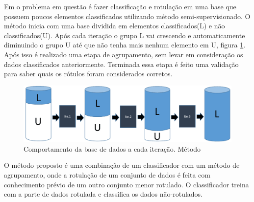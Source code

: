 Em \cite{Metodo2015} o problema em questão é fazer classificação e rotulação em uma base que possuem poucos elementos classificados utilizando método semi-supervisionado. O método inicia com uma base dividida em elementos classificados(L) e não classificados(U). Após cada iteração o grupo L vai crescendo e automaticamente diminuindo o grupo U até que não tenha mais nenhum elemento em U, figura  \ref{fig:modeloVicente}. Após isso é realizado uma etapa de agrupamento, sem levar em consideração os dados classificados anteriormente. Terminada essa etapa é feito uma validação para saber quais os rótulos foram considerados corretos.
\begin{figure}[!h]
        \centering
        \includegraphics[scale=0.4]{figs/modeloVicente.png}
        \caption{Comportamento da base de dados a cada iteração. Método \cite{Metodo2015}} \label{fig:modeloVicente}
\end{figure}

O método proposto é uma combinação de um classificador com um método de agrupamento, onde a rotulação de um conjunto de dados é feita com conhecimento prévio de um outro conjunto menor rotulado. O classificador treina com a parte de dados rotulada e classifica os dados não-rotulados.


